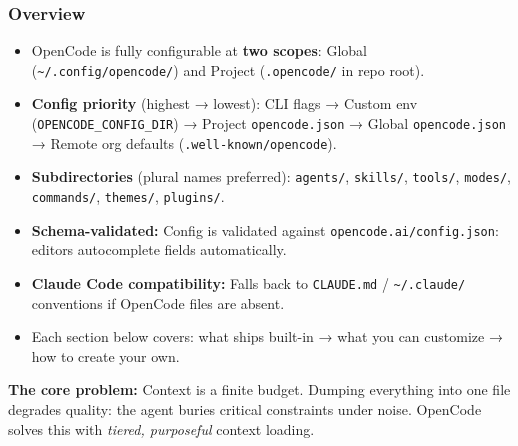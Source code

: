 \begin{frame}[fragile]\frametitle{Overview}
  \begin{itemize}
    \item OpenCode is fully configurable at \textbf{two scopes}: Global (\texttt{\textasciitilde/.config/opencode/}) and Project (\texttt{.opencode/} in repo root).
    \item \textbf{Config priority} (highest → lowest): CLI flags → Custom env (\texttt{OPENCODE\_CONFIG\_DIR}) → Project \texttt{opencode.json} → Global \texttt{opencode.json} → Remote org defaults (\texttt{.well-known/opencode}).
    \item \textbf{Subdirectories} (plural names preferred): \texttt{agents/}, \texttt{skills/}, \texttt{tools/}, \texttt{modes/}, \texttt{commands/}, \texttt{themes/}, \texttt{plugins/}.
    \item \textbf{Schema-validated:} Config is validated against \texttt{opencode.ai/config.json}:  editors autocomplete fields automatically.
    \item \textbf{Claude Code compatibility:} Falls back to \texttt{CLAUDE.md} / \texttt{\textasciitilde/.claude/} conventions if OpenCode files are absent.
    \item Each section below covers: what ships built-in → what you can customize → how to create your own.
  \end{itemize}
  
\textbf{The core problem:} Context is a finite budget. Dumping everything into one file degrades quality:  the agent buries critical constraints under noise. OpenCode solves this with \textit{tiered, purposeful} context loading.  
\end{frame}


